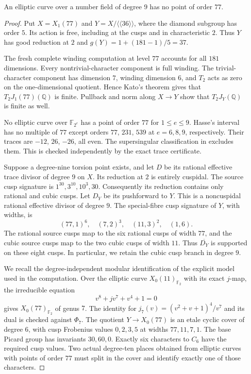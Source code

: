 
\begin{proposition}\label{prop:nonic-no77-continuation}
An elliptic curve over a number field of degree $9$ has no point of order $77$.
\end{proposition}
\begin{proof}
Put $X=X_1(77)$ and
$Y=X/\langle\langle36\rangle\rangle$, where the diamond subgroup
has order $5$. Its action is free, including at the cusps and in
characteristic $2$. Thus $Y$ has good reduction at $2$ and
$g(Y)=1+(181-1)/5=37$.

The fresh complete winding computation at level $77$ accounts for
all $181$ dimensions. Every nontrivial-character component is full
winding. The trivial-character component has dimension $7$, winding
 dimension $6$, and $T_2$ acts as zero on the one-dimensional quotient.
Hence Kato's theorem gives that $T_2J_1(77)(\mathbb Q)$ is finite.
Pullback and norm along $X\to Y$ show that $T_2J_Y(\mathbb Q)$ is
finite as well.

No elliptic curve over $\mathbb F_{2^e}$ has a point of order $77$
for $1\leq e\leq9$. Hasse's interval has no multiple of $77$ except
orders $77$, $231$, $539$ at $e=6,8,9$, respectively. Their traces
are $-12$, $26$, $-26$, all even. The supersingular classification
in \cite[Theorem~4.6]{DN} excludes them. This is checked independently
by the exact trace certificate.

Suppose a degree-nine torsion point exists, and let $D$ be its
rational effective trace divisor of degree $9$ on $X$.
Its reduction at $2$ is entirely cuspidal. The source cusp signature
is $1^{30},3^{10},10^3,30$.
Consequently its reduction contains only rational and cubic cusps.
Let $D_Y$ be its pushforward to $Y$. This is a noncuspidal rational
effective divisor of degree $9$.
The special-fibre cusp signature of $Y$, with widths, is
\[
 (77,1)^6,\quad(7,2)^3,\quad(11,3)^2,\quad(1,6).
\]
The rational source cusps map to the six rational cusps of width
$77$, and the cubic source cusps map to the two cubic cusps of
width $11$. Thus $\overline{D_Y}$ is supported on these eight cusps.
In particular, we retain the cubic cusp branch in degree $9$.

We recall the degree-independent modular identification of the
explicit model used in the computation. Over the elliptic curve
$X_0(11)_{\mathbb F_2}$ with its exact $j$-map, the irreducible equation
\[
 v^8+jv^7+v^4+1=0
\]
gives $X_0(77)_{\mathbb F_2}$ of genus $7$. The identity for
$j_7(v)=(v^2+v+1)^4/v^7$ and its dual is checked against $\Phi_7$.
The quotient $Y\to X_0(77)$ is an etale cyclic cover of degree $6$,
with cusp Frobenius values $0,2,3,5$ at widths $77,11,7,1$.
The base Picard group has invariants $30,60,0$.
Exactly six characters to $C_6$ have the required cusp values.
Two actual degree-ten places obtained from elliptic curves with
points of order $77$ must split in the cover and identify exactly
one of those characters.


\end{proof}
